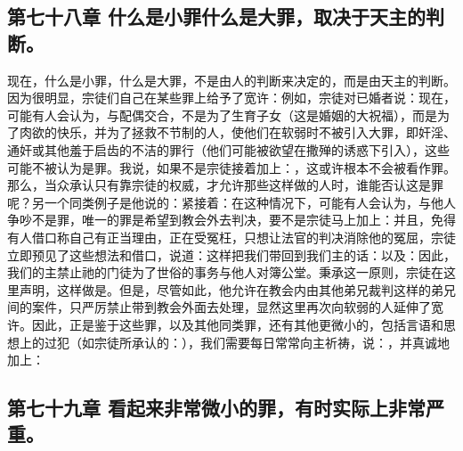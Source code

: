 
\subsection{第七十八章 什么是小罪什么是大罪，取决于天主的判断。}

现在，什么是小罪，什么是大罪，不是由人的判断来决定的，而是由天主的判断。因为很明显，宗徒们自己在某些罪上给予了宽许：例如，宗徒对已婚者说：现在，可能有人会认为，与配偶交合，不是为了生育子女（这是婚姻的大祝福），而是为了肉欲的快乐，并为了拯救不节制的人，使他们在软弱时不被引入大罪，即奸淫、通奸或其他羞于启齿的不洁的罪行（他们可能被欲望在撒殚的诱惑下引入），这些可能不被认为是罪。我说，如果不是宗徒接着加上：，这或许根本不会被看作罪。那么，当众承认只有靠宗徒的权威，才允许那些这样做的人时，谁能否认这是罪呢？另一个同类例子是他说的：紧接着：在这种情况下，可能有人会认为，与他人争吵不是罪，唯一的罪是希望到教会外去判决，要不是宗徒马上加上：并且，免得有人借口称自己有正当理由，正在受冤枉，只想让法官的判决消除他的冤屈，宗徒立即预见了这些想法和借口，说道：这样把我们带回到我们主的话：以及：因此，我们的主禁止祂的门徒为了世俗的事务与他人对簿公堂。秉承这一原则，宗徒在这里声明，这样做是。但是，尽管如此，他允许在教会内由其他弟兄裁判这样的弟兄间的案件，只严厉禁止带到教会外面去处理，显然这里再次向软弱的人延伸了宽许。因此，正是鉴于这些罪，以及其他同类罪，还有其他更微小的，包括言语和思想上的过犯（如宗徒所承认的：），我们需要每日常常向主祈祷，说：，并真诚地加上：\par


\subsection{第七十九章 看起来非常微小的罪，有时实际上非常严重。}

